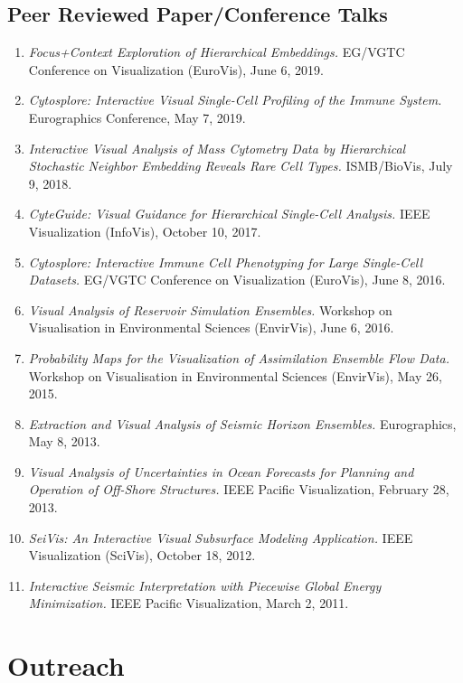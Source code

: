 \documentclass[10pt,a4paper,roman,final]{moderncv}
\begin{document}
\subsection*{Peer Reviewed Paper/Conference Talks}
\begin{enumerate}[leftmargin=0cm]
\item
\emph{Focus+Context Exploration of Hierarchical Embeddings.} EG/VGTC Conference on Visualization (EuroVis), June 6, 2019.
\item
\emph{Cytosplore: Interactive Visual Single-Cell Profiling of the Immune System.} Eurographics Conference, May 7, 2019.
\item
\emph{Interactive Visual Analysis of Mass Cytometry Data by Hierarchical Stochastic Neighbor Embedding Reveals Rare Cell Types.} ISMB/BioVis, July 9, 2018.
\item
\emph{CyteGuide: Visual Guidance for Hierarchical Single-Cell Analysis.} IEEE Visualization (InfoVis), October 10, 2017.
\item
\emph{Cytosplore: Interactive Immune Cell Phenotyping for Large Single-Cell Datasets.} EG/VGTC Conference on Visualization (EuroVis), June 8, 2016.
\item
\emph{Visual Analysis of Reservoir Simulation Ensembles.} Workshop on Visualisation in Environmental Sciences (EnvirVis), June 6, 2016.
\item
\emph{Probability Maps for the Visualization of Assimilation Ensemble Flow Data.} Workshop on Visualisation in Environmental Sciences (EnvirVis), May 26, 2015.
\item
\emph{Extraction and Visual Analysis of Seismic Horizon Ensembles.} Eurographics, May 8, 2013.
\item
\emph{Visual Analysis of Uncertainties in Ocean Forecasts for Planning and Operation of Off-Shore Structures.} IEEE Pacific Visualization, February 28, 2013.
\item
\emph{SeiVis: An Interactive Visual Subsurface Modeling Application.} IEEE Visualization (SciVis), October 18, 2012.
\item
\emph{Interactive Seismic Interpretation with Piecewise Global Energy Minimization.} IEEE Pacific Visualization, March 2, 2011.
\end{enumerate}



\section*{Outreach}
\end{document}
